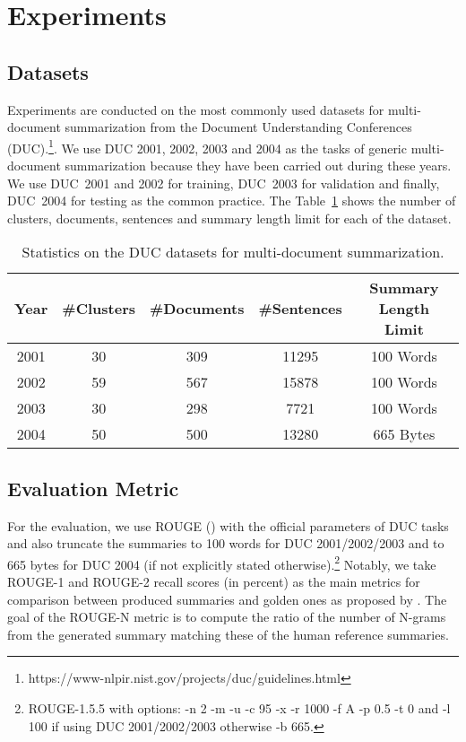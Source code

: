 \documentclass{article}
\begin{document}
\section{Experiments}
\label{sec:experiments}

\subsection{Datasets}

Experiments are conducted on the most commonly used datasets for multi-document summarization from the Document Understanding Conferences (DUC).\footnote{https://www-nlpir.nist.gov/projects/duc/guidelines.html}. We use DUC 2001, 2002, 2003 and 2004 as the tasks of generic multi-document summarization because they have been carried out during these years. We use DUC~2001 and 2002 for training, DUC~2003 for validation and finally, DUC~2004 for testing as the common practice. The Table~\ref{DUC_summary} shows the number of clusters, documents, sentences and summary length limit for each of the dataset.

\begin{table}
  \caption{Statistics on the DUC datasets for multi-document summarization.}
  \label{DUC_summary}
  \centering
  \begin{tabular}{ccccc}
    \toprule
    Year & \#Clusters & \#Documents & \#Sentences  & Summary Length Limit  \\
    \hline
    2001 & 30 & 309 & 11295 & 100 Words\\
    2002 & 59 & 567 & 15878 & 100 Words\\
    2003 & 30 & 298 & 7721 & 100 Words\\
    2004 & 50 & 500 & 13280 & 665 Bytes\\
    \bottomrule
  \end{tabular}
\end{table}

\subsection{Evaluation Metric}
\label{sub:evaluation_metric}

For the evaluation, we use ROUGE (\citet{Lin2004}) with the official parameters of DUC tasks and also truncate the summaries to 100 words for DUC 2001/2002/2003 and to 665 bytes for DUC 2004 (if not explicitly stated otherwise).\footnote{ROUGE-1.5.5 with options: -n 2 -m -u -c 95 -x -r 1000 -f A -p 0.5 -t 0 and -l 100 if using DUC 2001/2002/2003 otherwise -b 665.} Notably, we take ROUGE-1 and ROUGE-2 recall scores (in percent) as the main metrics for comparison between produced summaries and golden ones as proposed by \citet{Owczarzak2012}. The goal of the ROUGE-N metric is to compute the ratio of the number of N-grams from the generated summary matching these of the human reference summaries.
\end{document}
